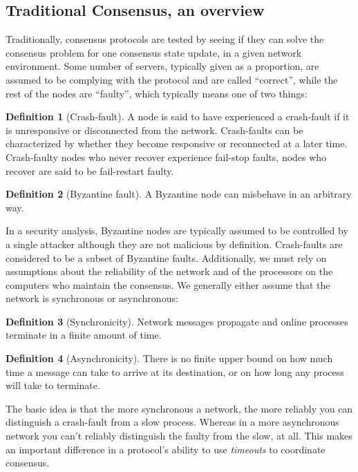 \documentclass[11pt,a4paper]{article}
\theoremstyle{plain}
\theoremstyle{definition}
\newtheorem{defn}{Definition}
\begin{document}
\subsection{Traditional Consensus, an overview}

Traditionally, consensus protocols are tested by seeing if they can solve the consensus problem for one consensus state update, in a given network environment. Some number of servers, typically given as a proportion, are assumed to be complying with the protocol and are called ``correct'', while the rest of the nodes are ``faulty'', which typically means one of two things:

\begin{defn}[Crash-fault]
A node is said to have experienced a crash-fault if it is unresponsive or disconnected from the network. Crash-faults can be characterized by whether they become responsive or reconnected at a later time. Crash-faulty nodes who never recover experience fail-stop faults, nodes who recover are said to be fail-restart faulty.
\end{defn}

\begin{defn}[Byzantine fault]
A Byzantine node can misbehave in an arbitrary way. 
\end{defn}

In a security analysis, Byzantine nodes are typically assumed to be controlled by a single attacker although they are not malicious by definition. Crash-faults are considered to be a subset of Byzantine faults. Additionally, we must rely on assumptions about the reliability of the network and of the processors on the computers who maintain the consensus. We generally either assume that the network is synchronous or asynchronous: 

\begin{defn}[Synchronicity]
Network messages propagate and online processes terminate in a finite amount of time.
\end{defn}

\begin{defn}[Asynchronicity]
There is no finite upper bound on how much time a message can take to arrive at its destination, or on how long any process will take to terminate. 
\end{defn}

The basic idea is that the more synchronous a network, the more reliably you can distinguish a crash-fault from a slow process. Whereas in a more asynchronous network you can't reliably distinguish the faulty from the slow, at all. This makes an important difference in a protocol's ability to use \emph{timeouts} to coordinate consensus. 
\end{document}
